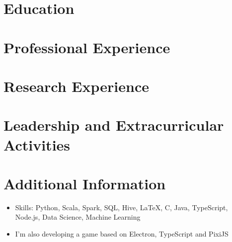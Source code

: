 \documentclass{resumeEN}
\begin{document}
\section{Education}

\pennmaster
\thuundergrad
\umnexchange

\section{Professional Experience}

\msra
\bytedance

\section{Research Experience}

\ryanresearch

\section{Leadership and Extracurricular Activities}

\eydatascience

\section{Additional Information}

\vspace{0.618ex}
\begin{itemize}
\item Skills: Python, Scala, Spark, SQL, Hive, {\LaTeX}, C, Java, TypeScript, Node.js, Data Science, Machine Learning
\item I'm also developing a game based on Electron, TypeScript and PixiJS
\end{itemize}
\end{document}
